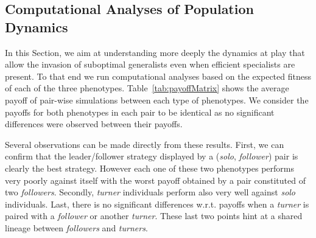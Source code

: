     \subsection{Computational Analyses of Population Dynamics}
      In this Section, we aim at understanding more deeply the dynamics at play that allow the invasion of suboptimal generalists even when efficient specialists are present. To that end we run computational analyses based on the expected fitness of each of the three phenotypes. Table~\ref{tab:payoffMatrix} shows the average payoff of pair-wise simulations between each type of phenotypes. We consider the payoffs for both phenotypes in each pair to be identical as no significant differences were observed between their payoffs.

      \begin{table}[hbtp]
        \caption{\textbf{Payoff matrix for pair-wise simulations of each phenotype.} Average payoffs of each phenotype against every phenotype in a pair-wise simulation. Each pair was evaluated $10$ times in order to decrease the stochastic effects of the initial conditions (i.e. random positions of the targets).}
        \label{tab:payoffMatrix}
      \end{table}

      Several observations can be made directly from these results. First, we can confirm that the leader/follower strategy displayed by a (\emph{solo}, \emph{follower}) pair is clearly the best strategy. However each one of these two phenotypes performs very poorly against itself with the worst payoff obtained by a pair constituted of two \emph{followers}. Secondly, \emph{turner} individuals perform also very well against \emph{solo} individuals. Last, there is no significant differences w.r.t. payoffs when a \emph{turner} is paired with a \emph{follower} or another \emph{turner}. These last two points hint at a shared lineage between \emph{followers} and \emph{turners}. 

